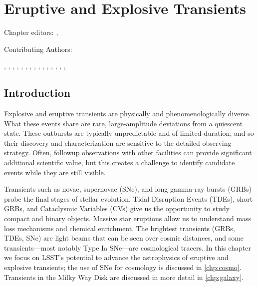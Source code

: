 
\chapter[Transients]{Eruptive and Explosive Transients}
\def\chpname{transients}\label{chp:\chpname}

Chapter editors:
,

Contributing Authors:

,
,
,
,
,
,
,
,
,
,
,
,
,
,
,

%


\section{Introduction}


Explosive and eruptive transients are physically and
phenomenologically diverse.   What these events share
are rare, large-amplitude deviations from a quiescent state.  These
outbursts are typically unpredictable and of limited duration, and so their
discovery and characterization are sensitive to the detailed observing
strategy.  Often, followup observations with other facilities can provide
significant additional scientific value, but this creates a challenge to
identify candidate events while they are still visible.

Transients such as novae, supernovae (SNe), and long gamma-ray bursts (GRBs)
probe the final stages of stellar evolution. Tidal Disruption Events
(TDEs), short GRBs, and
Cataclysmic Variables (CVs) give us the opportunity to study
compact and binary objects. Massive star eruptions allow us to understand
mass loss mechanisms and chemical enrichment.
The brightest transients (GRBs, TDEs,
SNe) are light beams that can be seen over cosmic distances, and some
transients---most notably Type Ia SNe---are cosmological tracers.
In this chapter we focus on LSST's potential to advance the astrophysics of
eruptive and explosive transients; the use of SNe for cosmology is
discussed in \autoref{chp:cosmo}. Transients in the Milky Way Disk are
discussed in more detail in \autoref{chp:galaxy}.

